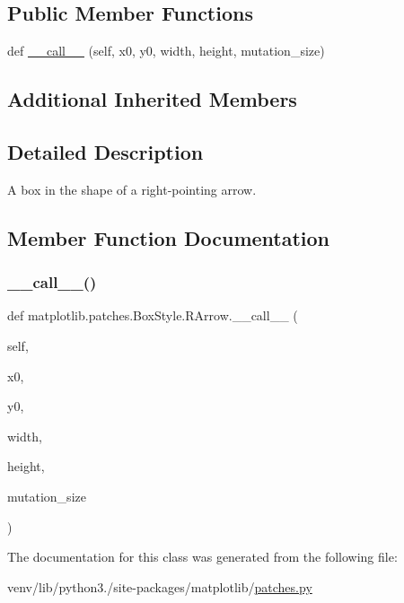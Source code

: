 \subsection*{Public Member Functions}
\begin{DoxyCompactItemize}
\item 
def \hyperlink{classmatplotlib_1_1patches_1_1BoxStyle_1_1RArrow_a5274748e927bb535b9e77992617693df}{\+\_\+\+\_\+call\+\_\+\+\_\+} (self, x0, y0, width, height, mutation\+\_\+size)
\end{DoxyCompactItemize}
\subsection*{Additional Inherited Members}


\subsection{Detailed Description}
\begin{DoxyVerb}A box in the shape of a right-pointing arrow.\end{DoxyVerb}
 

\subsection{Member Function Documentation}
\mbox{\label{classmatplotlib_1_1patches_1_1BoxStyle_1_1RArrow_a5274748e927bb535b9e77992617693df}} 
\subsubsection{\texorpdfstring{\+\_\+\+\_\+call\+\_\+\+\_\+()}{\_\_call\_\_()}}
{\footnotesize\ttfamily def matplotlib.\+patches.\+Box\+Style.\+R\+Arrow.\+\_\+\+\_\+call\+\_\+\+\_\+ (\begin{DoxyParamCaption}\item[{}]{self,  }\item[{}]{x0,  }\item[{}]{y0,  }\item[{}]{width,  }\item[{}]{height,  }\item[{}]{mutation\+\_\+size }\end{DoxyParamCaption})}



The documentation for this class was generated from the following file\+:\begin{DoxyCompactItemize}
\item 
venv/lib/python3./site-\/packages/matplotlib/\hyperlink{patches_8py}{patches.\+py}\end{DoxyCompactItemize}
